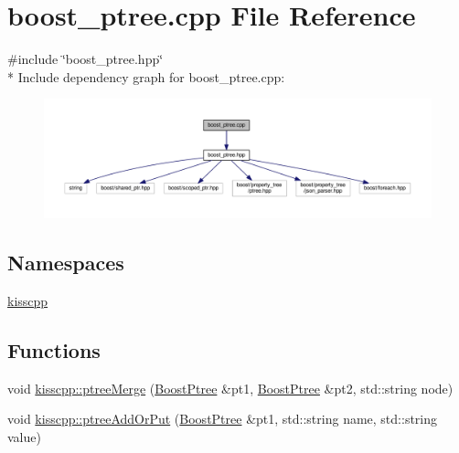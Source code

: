 \hypertarget{a00047}{\section{boost\-\_\-ptree.\-cpp File Reference}
\label{a00047}
}
{\ttfamily \#include \char`\"{}boost\-\_\-ptree.\-hpp\char`\"{}}\\*
Include dependency graph for boost\-\_\-ptree.\-cpp\-:\nopagebreak
\begin{figure}[H]
\begin{center}
\leavevmode
\includegraphics[width=350pt]{a00092}
\end{center}
\end{figure}
\subsection*{Namespaces}
\begin{DoxyCompactItemize}
\item 
\hyperlink{a00089}{kisscpp}
\end{DoxyCompactItemize}
\subsection*{Functions}
\begin{DoxyCompactItemize}
\item 
void \hyperlink{a00089_a36b9e65a0a3786bd85198e4530c65bf9}{kisscpp\-::ptree\-Merge} (\hyperlink{a00048_ab36820650b8e0db36402aea80485633c}{Boost\-Ptree} \&pt1, \hyperlink{a00048_ab36820650b8e0db36402aea80485633c}{Boost\-Ptree} \&pt2, std\-::string node)
\item 
void \hyperlink{a00089_a6bb122f9d1f472c12420a2ec59fdc287}{kisscpp\-::ptree\-Add\-Or\-Put} (\hyperlink{a00048_ab36820650b8e0db36402aea80485633c}{Boost\-Ptree} \&pt1, std\-::string name, std\-::string value)
\end{DoxyCompactItemize}
